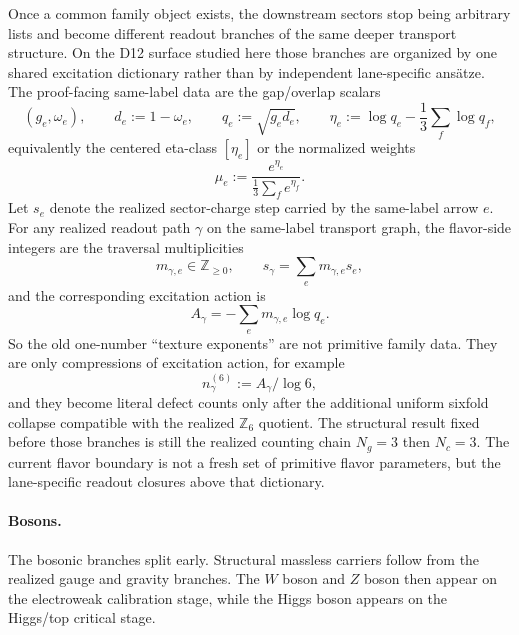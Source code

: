\documentclass[11pt]{article}
\begin{document}
Once a common family object exists, the downstream sectors stop being arbitrary lists and become
different readout branches of the same deeper transport structure. On the D12 surface studied here
those branches are organized by one shared excitation dictionary rather than by independent
lane-specific ans\"atze. The proof-facing same-label data are the gap/overlap scalars
\[
(g_e,\omega_e),
\qquad
d_e:=1-\omega_e,
\qquad
q_e:=\sqrt{g_e d_e},
\qquad
\eta_e:=\log q_e-\frac13\sum_f \log q_f,
\]
equivalently the centered eta-class \([\eta_e]\) or the normalized weights
\[
\mu_e:=\frac{e^{\eta_e}}{\frac13\sum_f e^{\eta_f}}.
\]
Let \(s_e\) denote the realized sector-charge step carried by the same-label arrow \(e\). For any realized readout path \(\gamma\) on the same-label transport graph, the flavor-side integers are the traversal multiplicities
\[
m_{\gamma,e}\in\mathbb Z_{\ge0},
\qquad
s_\gamma=\sum_e m_{\gamma,e}s_e,
\]
and the corresponding excitation action is
\[
A_\gamma
=
-\sum_e m_{\gamma,e}\log q_e.
\]
So the old one-number ``texture exponents'' are not primitive family data. They are only compressions of excitation action, for example
\[
n_\gamma^{(6)}:=A_\gamma/\log 6,
\]
and they become literal defect counts only after the additional uniform sixfold collapse compatible with the realized \(\mathbb Z_6\) quotient.
The structural result fixed before those branches is still the realized counting chain \(N_g=3\)
then \(N_c=3\). The current flavor boundary is not a fresh set of primitive flavor parameters, but the
lane-specific readout closures above that dictionary.

\paragraph{Bosons.}
The bosonic branches split early. Structural massless carriers follow from the realized
gauge and gravity branches. The \(W\) boson and \(Z\) boson then appear on the electroweak
calibration stage, while the Higgs boson appears on the Higgs/top critical stage.
\end{document}
